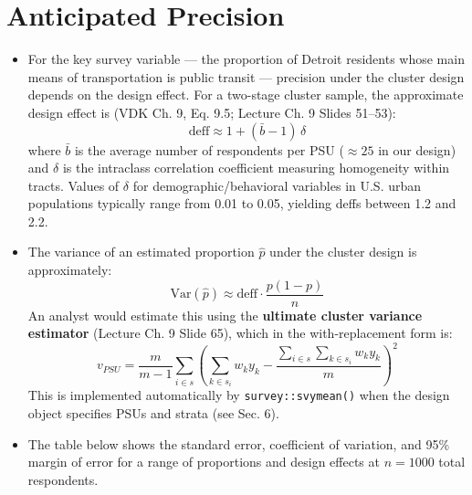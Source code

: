 \documentclass[
  11pt,
]{article}
\begin{document}
\section{Anticipated Precision}\label{sec-precision}

\begin{itemize}
\item
  For the key survey variable --- the proportion of Detroit residents
  whose main means of transportation is public transit --- precision
  under the cluster design depends on the design effect. For a two-stage
  cluster sample, the approximate design effect is (VDK Ch. 9, Eq. 9.5;
  Lecture Ch. 9 Slides 51--53):
  \[\text{deff} \approx 1 + (\bar{b} - 1) \, \delta\] where \(\bar{b}\)
  is the average number of respondents per PSU (\(\approx 25\) in our
  design) and \(\delta\) is the intraclass correlation coefficient
  measuring homogeneity within tracts. Values of \(\delta\) for
  demographic/behavioral variables in U.S. urban populations typically
  range from 0.01 to 0.05, yielding deffs between 1.2 and 2.2.
\item
  The variance of an estimated proportion \(\hat{p}\) under the cluster
  design is approximately:
  \[\text{Var}(\hat{p}) \approx \text{deff} \cdot \frac{p(1-p)}{n}\] An
  analyst would estimate this using the \textbf{ultimate cluster
  variance estimator} (Lecture Ch. 9 Slide 65), which in the
  with-replacement form is:
  \[v_{PSU} = \frac{m}{m-1} \sum_{i \in s} \left( \sum_{k \in s_i} w_k y_k - \frac{\sum_{i \in s} \sum_{k \in s_i} w_k y_k}{m} \right)^2\]
  This is implemented automatically by \texttt{survey::svymean()} when
  the design object specifies PSUs and strata (see Sec. 6).
\item
  The table below shows the standard error, coefficient of variation,
  and 95\% margin of error for a range of proportions and design effects
  at \(n = 1000\) total respondents.
\end{itemize}
\end{document}
